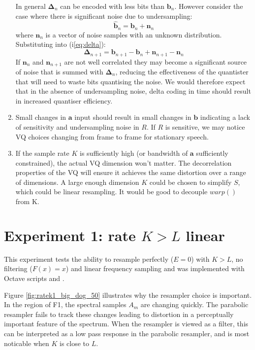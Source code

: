 \documentclass{article}
\begin{document}
\begin{enumerate}
In general $\mathbf{\Delta}_n$ can be encoded with less bits than $\mathbf{b}_n$.  However consider the case where there is significant noise due to undersampling:
\begin{equation}
\mathbf{\hat{b}}_n = \mathbf{b}_{n} + \mathbf{n}_{n}
\end{equation}
where $\mathbf{n}_{n}$ is a vector of noise samples with an unknown distribution. Substituting into (i\ref{eq:delta}):
\begin{equation}
\mathbf{\Delta}_{n+1} = \mathbf{b}_{n+1} - \mathbf{b}_{n} + \mathbf{n}_{n+1} - \mathbf{n}_{n}
\end{equation}
If $\mathbf{n}_{n}$ and $\mathbf{n}_{n+1}$ are not well correlated they may become a significant source of noise that is summed with $\mathbf{\Delta}_{n}$, reducing the effectiveness of the quantister that will need to waste bits quantising the noise. We would therefore expect that in the absence of undersampling noise, delta coding in time should result in increased quantiser efficiency.

\item Small changes in $\mathbf{a}$ input should result in small changes in $\mathbf{b}$ indicating a lack of sensitivity and undersampling noise in $R$.  If $R$ is sensitive, we may notice VQ choices changing from frame to frame for stationary speech.

\item If the sample rate $K$ is sufficiently high (or bandwidth of $\mathbf{a}$ sufficiently constrained), the actual VQ dimension won't matter.  The decorrelation properties of the VQ will ensure it achieves the same distortion over a range of dimensions.  A large enough dimension $K$ could be chosen to simplify $S$, which could be linear resampling. It would be good to decouple $warp()$ from K.
\end{enumerate}

\section{Experiment 1: rate $K>L$ linear}

This experiment tests the ability to resample perfectly ($E=0$) with $K>L$, no filtering ($F(x)=x$) and linear frequency sampling and was implemented with Octave scripts  and .

Figure \ref{fig:ratek1_big_dog_50} illustrates why the resampler choice is important.  In the region of F1, the spectral samples $A_{m}$ are changing quickly.  The parabolic resampler fails to track these changes leading to distortion in a perceptually important feature of the spectrum.  When the resampler is viewed as a filter, this can be interpreted as a low pass response in the parabolic resampler, and is most noticable when $K$ is close to $L$.
\end{document}
